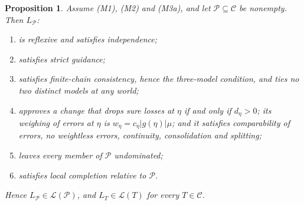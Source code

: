\documentclass[11pt]{article}
\newtheorem{proposition}[theorem]{Proposition}
\theoremstyle{definition}
\newcommand{\C}{\mathcal C}
\newcommand{\Lc}{\mathcal L}
\newcommand{\Pc}{\mathcal P}
\begin{document}
\begin{proposition}\label{prop:LP}
Assume (M1), (M2) and (M3a), and let $\Pc\subseteq\C$ be nonempty. Then $L_\Pc$:
\begin{enumerate}[label=(\alph*)]
\item is reflexive and satisfies independence;
\item satisfies strict guidance;
\item satisfies finite-chain consistency, hence the three-model condition, and ties no two distinct models at any world;
\item approves a change that drops sure losses at $\eta$ if and only if $d_\eta>0$; its weighing of errors at $\eta$ is $w_\eta=c_\eta|g(\eta)|\mu$; and it satisfies comparability of errors, no weightless errors, continuity, consolidation and splitting;
\item leaves every member of $\Pc$ undominated;
\item satisfies local completion relative to $\Pc$.
\end{enumerate}
Hence $L_\Pc\in\Lc(\Pc)$, and $L_T\in\Lc(T)$ for every $T\in\C$.
\end{proposition}
\end{document}
